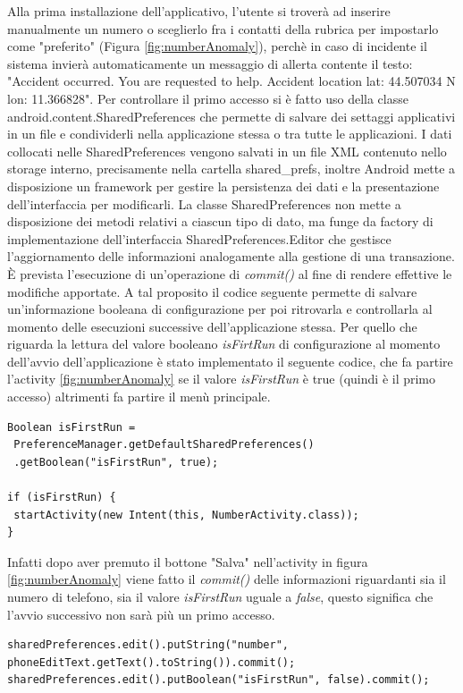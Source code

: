 \documentclass[a4paper, 11pt]{article} %
\begin{document}
Alla prima installazione dell'applicativo, l'utente si troverà ad inserire manualmente un numero o sceglierlo fra i contatti della rubrica per impostarlo come "preferito" (Figura \ref{fig:numberAnomaly}), perchè in caso di incidente il sistema invierà automaticamente un messaggio di allerta contente il testo: "Accident occurred. You are requested to help. Accident location lat: 44.507034 N lon: 11.366828". Per controllare il primo accesso si è fatto uso della classe android.content.SharedPreferences che permette di salvare dei settaggi applicativi in un file e condividerli nella applicazione stessa o tra tutte le applicazioni. I dati collocati nelle SharedPreferences vengono salvati in un file XML contenuto nello storage interno, precisamente nella cartella shared\_prefs, inoltre Android mette a disposizione un framework per gestire la persistenza dei dati e la presentazione dell'interfaccia per modificarli.
La classe SharedPreferences non mette a disposizione dei metodi relativi a ciascun tipo di dato, ma funge da factory di implementazione dell'interfaccia SharedPreferences.Editor che gestisce l'aggiornamento delle informazioni analogamente alla gestione di una transazione. È prevista l'esecuzione di un'operazione di \textit{commit()} al fine di rendere effettive le modifiche apportate. A tal proposito il codice seguente permette di salvare un'informazione booleana di configurazione per poi ritrovarla e controllarla al momento delle esecuzioni successive dell'applicazione stessa. Per quello che riguarda la lettura del valore booleano \textit{isFirtRun} di configurazione al momento dell'avvio dell'applicazione è stato implementato il seguente codice, che fa partire l'activity \ref{fig:numberAnomaly} se il valore \textit{isFirstRun} è true (quindi è il primo accesso) altrimenti fa partire il menù principale.
\begin{lstlisting}
Boolean isFirstRun =  
 PreferenceManager.getDefaultSharedPreferences()
 .getBoolean("isFirstRun", true);

if (isFirstRun) {
 startActivity(new Intent(this, NumberActivity.class));
}
\end{lstlisting}
Infatti dopo aver premuto il bottone "Salva" nell'activity in figura \ref{fig:numberAnomaly} viene fatto il \textit{commit()} delle informazioni riguardanti sia il numero di telefono, sia il valore \textit{isFirstRun} uguale a \textit{false}, questo significa che l’avvio successivo non sarà più un primo accesso.
\begin{lstlisting}
sharedPreferences.edit().putString("number", phoneEditText.getText().toString()).commit();
sharedPreferences.edit().putBoolean("isFirstRun", false).commit();
\end{lstlisting}
\end{document}
